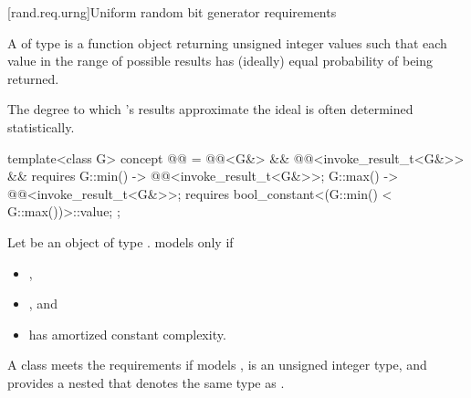 %



[rand.req.urng]{Uniform random bit generator requirements}%
%

\pnum
A 
 of type 
is a function object
returning unsigned integer values
such that each value
in the range of possible results
has (ideally) equal probability
of being returned.
\begin{note}
 The degree to which 's results
 approximate the ideal
 is often determined statistically.
\end{note}

\begin{codeblock}
template<class G>
  concept @@ =
    @@<G&> && @@<invoke_result_t<G&>> &&
    requires {
      { G::min() } -> @@<invoke_result_t<G&>>;
      { G::max() } -> @@<invoke_result_t<G&>>;
      requires bool_constant<(G::min() < G::max())>::value;
    };
\end{codeblock}

\pnum
Let  be an object of type .  models
 only if
\begin{itemize}
\item {},
\item {}, and
\item {} has amortized constant complexity.
\end{itemize}

%
%
\pnum
A class  meets the  requirements if
 models ,
 is an unsigned integer type,
and
 provides a nested  
that denotes the same type as .



